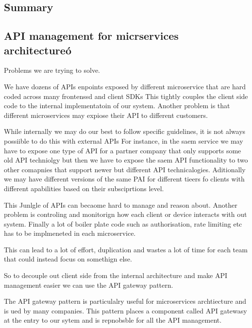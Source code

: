 \documentclass[a4paper, 11pt]{book}
\begin{document}
{    \subsection{Summary}

    \subsection{API management for micrservices architectureó}
    Problems we are trying to solve.

    We have dozens of APIs enpoints exposed by different microservice that are hard coded across many frontenssd and client SDKs
    This tightly couples the client side code to the internal implementatoin of our system.
    Another problem is that different microservices may expiose their API to different customers.

    While internally we may do our best to follow specific guidelines, it is not always possiible to do this with external APIs
    For instance, in the saem service we may have to expose one type of API for a partner company that only supports some old API techniolgy but then we have to expose the saem API functionality to two other comapnies that support newer but different API technicalogies.
    Aditionally we may have different versions of the same PAI for different tieers fo clients with different apabilities based on their subsciprtions level.

    This Junlgle of APIs can becaome hard to manage and reason about.
    Another problem is controling and monitorign how each client or device interacts with out system.
    Finally a lot of boiler plate code such as authorisation, rate limiting etc has to be implmeneted in each microservice.

    This can lead to a lot of effort, duplication and wastes a lot of time for each team that could instead focus on somethign else.

    So to decouple out client side from the internal architecture and make API management easier we can use the API gateway pattern.

    The API gateway pattern is particulalry useful for microservices archtiecture and is ued by many companies.
    This pattern places a component called API gatewasy at the entry to our sytem and is repnobsble for all the API management.

}
\end{document}
